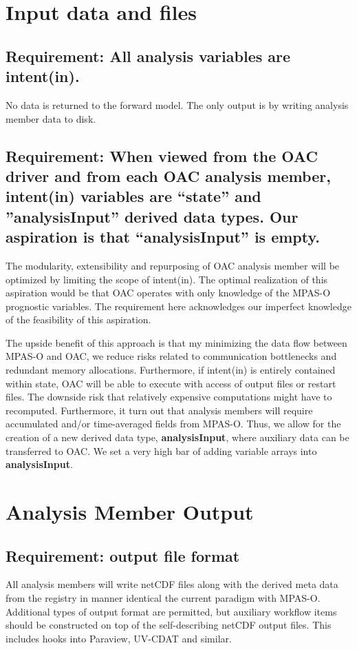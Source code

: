 \documentclass[11pt]{report}
\begin{document}
\newpage
\section{Input data and files}

\subsection{{\color{green} Requirement:} All analysis variables are intent(in).}
No data is returned to the forward model.  The only output is by writing analysis member data to disk.

\subsection{{\color{red} Requirement:} When viewed from the OAC driver and from each OAC analysis member, intent(in) variables are ``state'' and ''analysisInput'' derived data types. Our aspiration is that ``analysisInput'' is empty.}
The modularity, extensibility and repurposing of OAC analysis member will be optimized by limiting the scope of intent(in). The optimal realization of this aspiration would be that OAC operates with only knowledge of the MPAS-O prognostic variables. The requirement here acknowledges our imperfect knowledge of the feasibility of this aspiration.

The upside benefit of this approach is that my minimizing the data flow between MPAS-O and OAC, we reduce risks related to communication bottlenecks and redundant memory allocations. Furthermore, if intent(in) is entirely contained within state, OAC will be able to execute with access of output files or restart files. The downside risk that relatively expensive computations might have to recomputed. Furthermore, it turn out that analysis members will require accumulated and/or time-averaged fields from MPAS-O. Thus, we allow for the creation of a new derived data type, {\bf analysisInput}, where auxiliary data can be transferred to OAC. We set a very high bar of adding variable arrays into {\bf analysisInput}.

\newpage
\section{Analysis Member Output}
\subsection{{\color{red} Requirement:} output file format}
All analysis members will write netCDF files along with the derived meta data from the registry in manner identical the current paradigm with MPAS-O. Additional types of output format are permitted, but auxiliary workflow items should be constructed on top of the self-describing netCDF output files. This includes hooks into Paraview, UV-CDAT and similar.
\end{document}

